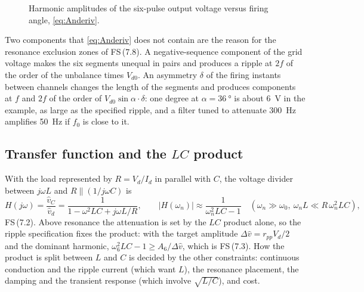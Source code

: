 \documentclass[10pt,a4paper]{scrartcl}
\newcommand{\Vdo}{V_{d0}}
\newcommand{\Vd}{V_{d}}
\newcommand{\Id}{I_{d}}
\newcommand{\fs}[1]{\textsf{FS}\,(#1)}
\begin{document}
\begin{figure}[htb]
\centering
{}
\caption{Harmonic amplitudes of the six-pulse output voltage versus firing angle, \eqref{eq:Anderiv}.}
\label{fig:An}
\end{figure}

Two components that \eqref{eq:Anderiv} does not contain are the reason for the resonance exclusion zones of \fs{7.8}. A negative-sequence component of the grid voltage makes the six segments unequal in pairs and produces a ripple at $2f$ of the order of the unbalance times $\Vdo$. An asymmetry $\delta$ of the firing instants between channels changes the length of the segments and produces components at $f$ and $2f$ of the order of $\Vdo\sin\alpha\cdot\delta$: one degree at $\alpha = \SI{36}{\degree}$ is about \SI{6}{V} in the example, as large as the specified ripple, and a filter tuned to attenuate \SI{300}{Hz} amplifies \SI{50}{Hz} if $f_0$ is close to it.

\subsection{Transfer function and the \texorpdfstring{$LC$}{LC} product}
With the load represented by $R = \Vd/\Id$ in parallel with $C$, the voltage divider between $j\omega L$ and $R\parallel(1/j\omega C)$ is
\begin{equation}
H(j\omega) = \frac{\hat v_C}{\hat v_d} = \frac{1}{1 - \omega^2LC + j\omega L/R} ,
\qquad
|H(\omega_n)| \approx \frac{1}{\omega_n^2LC - 1} \quad (\omega_n\gg\omega_0,\ \omega_nL\ll R\,\omega_n^2LC) ,
\label{eq:Hderiv}
\end{equation}
\fs{7.2}. Above resonance the attenuation is set by the $LC$ product alone, so the ripple specification fixes the product: with the target amplitude $\Delta\hat v = r_{pp}\Vd/2$ and the dominant harmonic, $\omega_6^2LC - 1\ge A_6/\Delta\hat v$, which is \fs{7.3}. How the product is split between $L$ and $C$ is decided by the other constraints: continuous conduction and the ripple current (which want $L$), the resonance placement, the damping and the transient response (which involve $\sqrt{L/C}$), and cost.
\end{document}
